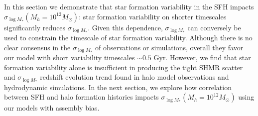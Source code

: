 \documentclass[12pt, letterpaper, preprint, tighten]{aastex62}
\newcommand{\edt}[1]{{\color{dred}{\bf} #1}}
\newcommand{\siglogm}{\sigma_{\log M_*}}
\begin{document}
\edt{In this section we demonstrate that star formation variability in the SFH impacts
$\siglogm(M_h=10^{12}M_\odot)$: star formation variability on shorter timescales significantly 
reduces $\siglogm$. Given this dependence, $\siglogm$ can conversely be used to constrain
the timescale of star formation variability. Although there is no clear consensus in 
the $\siglogm$ of observations or simulations, overall they favor our model with short 
variability timescales $\sim0.5$ Gyr. However, we find that star formation variability 
alone is insufficient in producing the tight SHMR scatter and $\siglogm$ redshift evolution 
trend found in halo model observations and hydrodynamic simulations. In the next section, 
we explore how correlation between SFH and halo formation histories impacts $\siglogm(M_h=10^{12}M_\odot)$
using our models with assembly bias.
}
\end{document}
